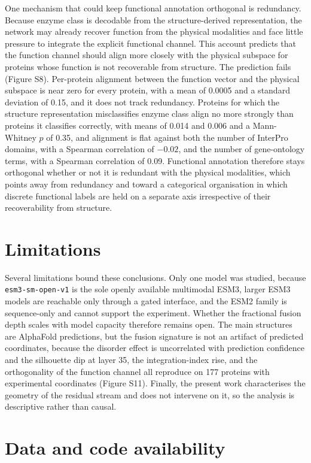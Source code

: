 \documentclass[11pt]{article}
\begin{document}
One mechanism that could keep functional annotation orthogonal is redundancy. Because
enzyme class is decodable from the structure-derived representation, the network may
already recover function from the physical modalities and face little pressure to
integrate the explicit functional channel. This account predicts that the function
channel should align more closely with the physical subspace for proteins whose
function is not recoverable from structure. The prediction fails
(Figure S8). Per-protein alignment between the function vector and the
physical subspace is near zero for every protein, with a mean of 0.0005 and a standard
deviation of 0.15, and it does not track redundancy. Proteins for which the structure
representation misclassifies enzyme class align no more strongly than proteins it
classifies correctly, with means of 0.014 and 0.006 and a Mann-Whitney $p$ of 0.35,
and alignment is flat against both the number of InterPro domains, with a Spearman
correlation of $-0.02$, and the number of gene-ontology terms, with a Spearman
correlation of 0.09. Functional annotation therefore stays orthogonal whether or not
it is redundant with the physical modalities, which points away from redundancy and
toward a categorical organisation in which discrete functional labels are held on a
separate axis irrespective of their recoverability from structure.

\section{Limitations}

Several limitations bound these conclusions. Only one model was studied, because
\texttt{esm3-sm-open-v1} is the sole openly available multimodal ESM3, larger ESM3
models are reachable only through a gated interface, and the ESM2 family
\cite{lin2023} is sequence-only and cannot support the experiment. Whether the fractional fusion depth
scales with model capacity therefore remains open. The main structures are AlphaFold
predictions, but the fusion signature is not an artifact of predicted coordinates,
because the disorder effect is uncorrelated with prediction confidence and the
silhouette dip at layer 35, the integration-index rise, and the orthogonality of the
function channel all reproduce on 177 proteins with experimental coordinates
(Figure S11). Finally, the present work
characterises the geometry of the residual stream and does not intervene on it, so
the analysis is descriptive rather than causal.

\section*{Data and code availability}
\end{document}
